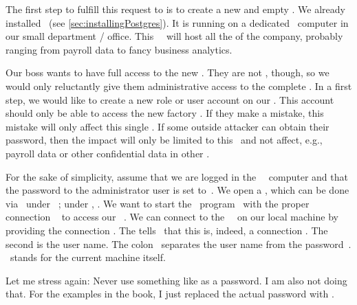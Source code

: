 %
%
%
%
%
The first step to fulfill this request to is to create a new and empty \db.
We already installed \postgresql\ (see \cref{sec:installingPostgres}).
It is running on a dedicated \server\ computer in our small  department / office.
This \db\ \server\ will host all the  of the company, probably ranging from payroll data to fancy business analytics.

Our boss wants to have full access to the new \db.
They are not , though, so we would only reluctantly give them administrative access to the complete \server.
In a first step, we would like to create a new role or user account on our \dbms.
This account should only be able to access the new factory \db.
If they make a mistake, this mistake will only affect this single \db.
If some outside attacker can obtain their password, then the impact will only be limited to this \db\ and not affect, e.g., payroll data or other confidential data in other .

For the sake of simplicity, assume that we are logged in the \db~\server\ computer and that the password to the administrator user  is set to~.
We open a , which can be done via \ubuntuTerminal\ under \ubuntu\ \linux; under \microsoftWindows, \windowsTerminal.
We want to start the \client\ program \psql\ with the proper connection ~\cite{PGDG:PD} to access our \postgresql\ \server.%
%
%
%
We can connect to the \postgresql\ \server\ on our local machine by providing the connection  .
The  tells \psql\ that this is, indeed, a connection .
The second  is the user name.
The colon~\inQuotes{\textil{:}} separates the user name from the password~.
\localhost\ stands for the current machine itself.

Let me stress again:
Never use something like  as a password.
I am also not doing that.
For the examples in the book, I just replaced the actual password with .

